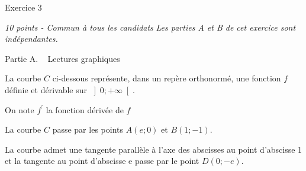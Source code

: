 
%
\begin{h2}Exercice 3 \end{h2}
\textit{10 points - Commun à tous les candidats }
\textit{Les parties A et B de cet exercice sont indépendantes. }
\begin{h3}Partie A. ~ Lectures graphiques\end{h3}
La courbe $C$ ci-dessous représente, dans un repère orthonormé, une fonction $f$ définie et dérivable sur $\left]0 ; +\infty \right[$.
\par
On note $f^{\prime}$ la fonction dérivée de $f$
\par
La courbe $C$ passe par les points $A\left(e ; 0\right)$ et $B\left(1 ; -1\right)$.
\par
La courbe admet une tangente parallèle à l'axe des abscisses au point d'abscisse 1 et la tangente au point d'abscisse e passe par le point $D\left(0 ; -e\right)$.

